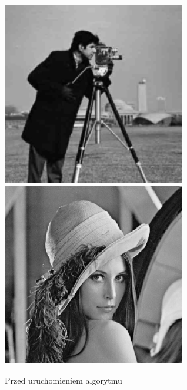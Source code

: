 \documentclass[a4paper,12pt]{book}
\begin{document}
\begin{figure}[H]
	\caption{Przed uruchomieniem algorytmu}
	\includegraphics[width=8cm, height=8cm]{man-unmodified.jpg}
	\includegraphics[width=8cm, height=8cm]{lena-unmodified.png}
\end{figure}
\end{document}
